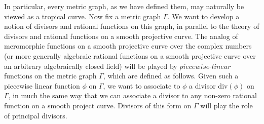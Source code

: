 \documentclass{article}
\begin{document}
\newline
In particular, every metric graph, as we have defined them, may naturally be viewed as a tropical curve. 
\newline
\newline
Now fix a metric graph $\Gamma$. We want to develop a notion of divisors and rational functions on this graph, in parallel to the theory of divisors and rational functions on a smooth projective curve. The analog of meromorphic functions on a smooth projective curve over the complex numbers (or more generally algebraic rational functions on a smooth projective curve over an arbitrary algebraically closed field) will be played by $\textit{piecewise-linear}$ functions on the metric graph $\Gamma$, which are defined as follows. Given such a piecewise linear function $\phi$ on $\Gamma$, we want to associate to $\phi$ a divisor $\text{div}(\phi)$ on $\Gamma$, in much the same way that we can associate a divisor to any non-zero rational function on a smooth project curve. Divisors of this form on $\Gamma$ will play the role of principal divisors. 
\end{document}
